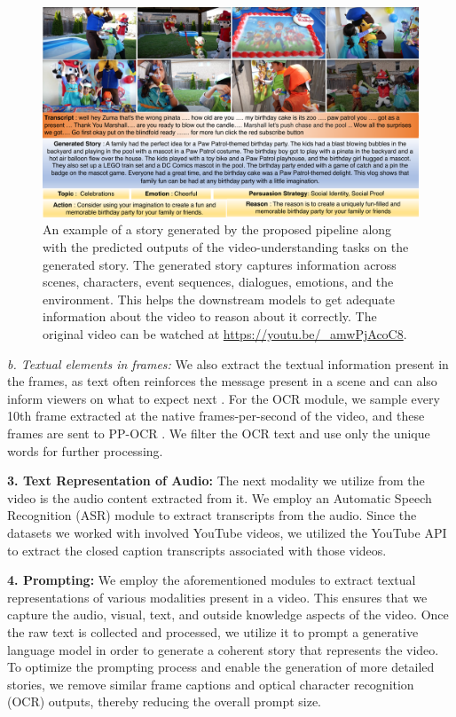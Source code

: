 \begin{figure}[!t]
    \centering
    \includegraphics[width=\textwidth]{images/example-stories.pdf}
    \caption{An example of a story generated by the proposed pipeline along with the predicted outputs of the video-understanding tasks on the generated story. The generated story captures information across scenes, characters, event sequences, dialogues, emotions, and the environment. This helps the downstream models to get adequate information about the video to reason about it correctly. The original video can be watched at \url{https://youtu.be/_amwPjAcoC8}.}
    \label{fig:example-story}
\end{figure}


\textit{b. Textual elements in frames:} We also extract the textual information present in the frames, as text often reinforces the message present in a scene and can also inform viewers on what to expect next \cite{9578608}. 
For the OCR module, we sample every 10th frame extracted at the native frames-per-second of the video, and these frames are sent to PP-OCR \cite{10.1145/2629489}. We filter the OCR text and use only the unique words for further processing.

\noindent \textbf{3. Text Representation of Audio:} The next modality we utilize from the video is the audio content extracted from it. We employ an Automatic Speech Recognition (ASR) module to extract transcripts from the audio. Since the datasets we worked with involved YouTube videos, we utilized the YouTube API to extract the closed caption transcripts associated with those videos.

\noindent \textbf{4. Prompting:} We employ the aforementioned modules to extract textual representations of various modalities present in a video. This ensures that we capture the audio, visual, text, and outside knowledge aspects of the video. Once the raw text is collected and processed, we utilize it to prompt a generative language model in order to generate a coherent story that represents the video. To optimize the prompting process and enable the generation of more detailed stories, we remove similar frame captions and optical character recognition (OCR) outputs, thereby reducing the overall prompt size. %


